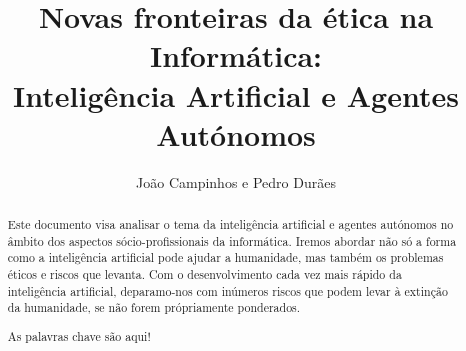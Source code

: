 \documentclass[runningheads,a4paper]{llncs}
\newcommand{\keywords}[1]{\par\addvspace\baselineskip\noindent\keywordname\enspace\ignorespaces#1}
\begin{document}
\mainmatter%

\title{Novas fronteiras da ética na Informática:\\Inteligência Artificial e Agentes Autónomos}


%
%
\author{João Campinhos e Pedro Durães}
%


%
%

\maketitle


\begin{abstract}
Este documento visa analisar o tema da inteligência artificial e agentes autónomos no âmbito dos aspectos sócio-profissionais da informática.
Iremos abordar não só a forma como a inteligência artificial pode ajudar a humanidade, mas também os problemas éticos e riscos que levanta.
Com o desenvolvimento cada vez mais rápido da inteligência artificial, deparamo-nos com inúmeros riscos que podem levar à extinção da humanidade, se não forem própriamente ponderados.
\keywords{As palavras chave são aqui!}
\end{abstract}
\end{document}
